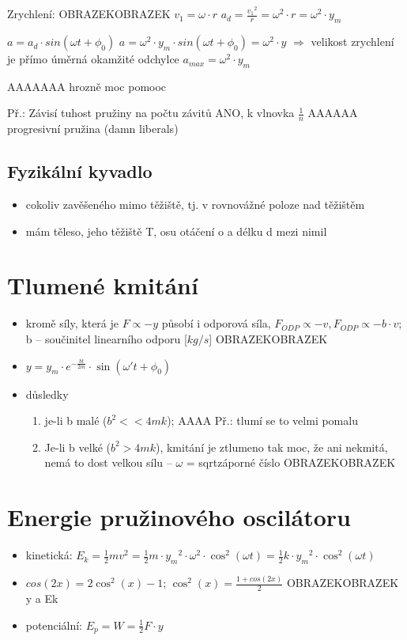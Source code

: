 \documentclass{article}
\begin{document}
Zrychlení: OBRAZEKOBRAZEK
           $v_1 = \omega \cdot r$
           $a_d = \frac{{v_1}^2}{r} = \omega^2 \cdot r = \omega^2 \cdot y_m$

           $a = a_d \cdot sin(\omega t + {\phi}_0)$
           $a = \omega^2 \cdot y_m \cdot sin(\omega t + {\phi}_0) = \omega^2 \cdot y$ $\Rightarrow$ velikost zrychlení je přímo úměrná okamžité odchylce
           $a_{max} = \omega^2 \cdot y_m$

AAAAAAA hrozně moc pomooc

Př.: Závisí tuhost pružiny na počtu závitů
     ANO, k {vlnovka} $\frac{1}{n}$
     AAAAAA progresivní pružina (damn liberals)

\subsection{Fyzikální kyvadlo}
\begin{itemize}
  \item cokoliv zavěšeného mimo těžiště, tj. v rovnovážné poloze nad těžištěm
  \item mám těleso, jeho těžiště T, osu otáčení o a délku d mezi nimil
\end{itemize}

\section{Tlumené kmitání}
\begin{itemize}
  \item kromě síly, která je $F \propto -y$ působí i odporová síla, $F_{ODP} \propto -v, F_{ODP} \propto -b\cdot v$; b -- součinitel linearního odporu [$kg/s$] OBRAZEKOBRAZEK
  \item $y = y_m \cdot e^{- \frac{bt}{2m}}\cdot \sin(\omega' t + {\phi}_{0})$
  \item důsledky
  \begin{enumerate}
    \item je-li b malé ($b^2 << 4mk$); AAAA Př.: tlumí se to velmi pomalu
    \item Je-li b velké ($b^2 > 4mk$), kmitání je ztlumeno tak moc, že ani nekmitá, nemá to dost velkou sílu -- $\omega$ = sqrt{záporné číslo} OBRAZEKOBRAZEK
  \end{enumerate}
\end{itemize}

\section{Energie pružinového oscilátoru}
\begin{itemize}
  \item kinetická: $E_k = \frac{1}{2}mv^2=\frac{1}{2}m\cdot{y_m}^2\cdot\omega^2\cdot \cos^2(\omega t)=\frac{1}{2}k\cdot{y_m}^2\cdot \cos^2(\omega t)$
  \item $cos(2x)=2 \cos^2(x)-1$; $\cos^2(x) = \frac{1+cos(2x)}{2}$ OBRAZEKOBRAZEK y a Ek
  \item potenciální: $E_p = W = \frac{1}{2}F\cdot y$
\end{itemize}
\end{document}
